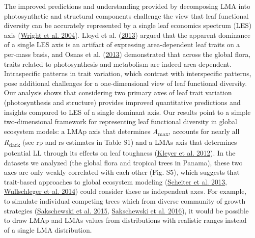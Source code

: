 \documentclass[
  12pt,
]{article}
\begin{document}
The improved predictions and understanding provided by decomposing LMA into photosynthetic and structural components challenge the view that leaf functional diversity can be accurately represented by a single leaf economics spectrum (LES) axis (\protect\hyperlink{ref-Wright2004a}{Wright et al. 2004}).
Lloyd et al. (\protect\hyperlink{ref-Lloyd2013}{2013}) argued that the apparent dominance of a single LES axis is an artifact of expressing area-dependent leaf traits on a per-mass basis, and Osnas et al. (\protect\hyperlink{ref-Osnas2013}{2013}) demonstrated that across the global flora, traits related to photosynthesis and metabolism are indeed area-dependent.
Intraspecific patterns in trait variation, which contrast with interspecific patterns, pose additional challenges for a one-dimensional view of leaf functional diversity. Our analysis shows that considering two primary axes of leaf trait variation (photosynthesis and structure) provides improved quantitative predictions and insights compared to LES of a single dominant axis.
Our results point to a simple two-dimensional framework for representing leaf functional diversity in global ecosystem models: a LMAp axis that determines \emph{A}\textsubscript{max}, accounts for nearly all \emph{R}\textsubscript{dark} (see rp and rs estimates in Table S1) and a LMAs axis that determines potential LL through its effects on leaf toughness (\protect\hyperlink{ref-Kleyer2012}{Kleyer et al. 2012}).
In the datasets we analyzed (the global flora and tropical trees in Panama), these two axes are only weakly correlated with each other (Fig. S5), which suggests that trait-based approaches to global ecosystem modeling (\protect\hyperlink{ref-Scheiter2013}{Scheiter et al. 2013}, \protect\hyperlink{ref-Wullschleger2014}{Wullschleger et al. 2014}) could consider these as independent axes.
For example, to simulate individual competing trees which from diverse community of growth strategies (\protect\hyperlink{ref-Sakschewski2015}{Sakschewski et al. 2015}, \protect\hyperlink{ref-Sakschewski2016}{Sakschewski et al. 2016}), it would be possible to draw LMAp and LMAs values from distributions with realistic ranges instead of a single LMA distribution.
\end{document}
